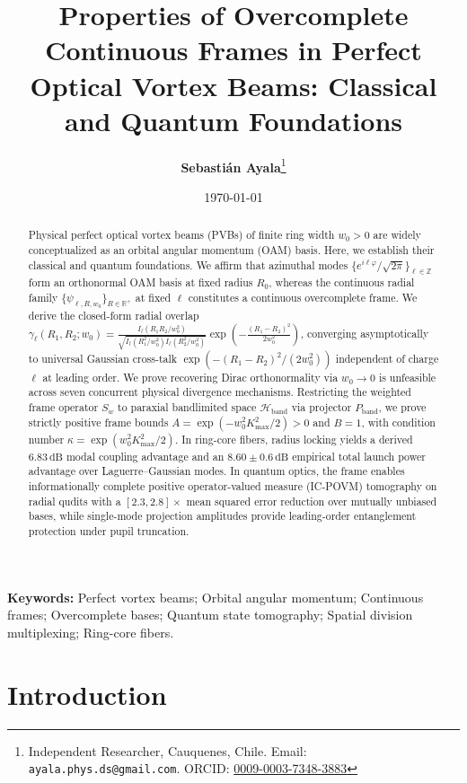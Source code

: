 \documentclass[11pt,a4paper]{article}
\title{\textbf{\LARGE Properties of Overcomplete Continuous Frames in Perfect Optical Vortex Beams: Classical and Quantum Foundations}}
\author{\textbf{Sebastián Ayala}\thanks{Independent Researcher, Cauquenes, Chile. Email: \texttt{ayala.phys.ds@gmail.com}. ORCID: \href{https://orcid.org/0009-0003-7348-3883}{0009-0003-7348-3883}}}
\date{\today}
\begin{document}
\maketitle

\begin{abstract}
Physical perfect optical vortex beams (PVBs) of finite ring width $w_0 > 0$ are widely conceptualized as an orbital angular momentum (OAM) basis. Here, we establish their classical and quantum foundations. We affirm that azimuthal modes $\{e^{i\ell\varphi}/\sqrt{2\pi}\}_{\ell \in \mathbb{Z}}$ form an orthonormal OAM basis at fixed radius $R_0$, whereas the continuous radial family $\{\psi_{\ell, R, w_0}\}_{R \in \mathbb{R}^+}$ at fixed $\ell$ constitutes a continuous overcomplete frame. We derive the closed-form radial overlap $\gamma_\ell(R_1, R_2; w_0) = \frac{I_\ell(R_1 R_2 / w_0^2)}{\sqrt{I_\ell(R_1^2/w_0^2) I_\ell(R_2^2/w_0^2)}} \exp\left(-\frac{(R_1-R_2)^2}{2w_0^2}\right)$, converging asymptotically to universal Gaussian cross-talk $\exp(-(R_1-R_2)^2 / (2w_0^2))$ independent of charge $\ell$ at leading order. We prove recovering Dirac orthonormality via $w_0 \to 0$ is unfeasible across seven concurrent physical divergence mechanisms. Restricting the weighted frame operator $S_w$ to paraxial bandlimited space $\mathcal{H}_{\text{band}}$ via projector $P_{\text{band}}$, we prove strictly positive frame bounds $A = \exp(-w_0^2 K_{\max}^2 / 2) > 0$ and $B = 1$, with condition number $\kappa = \exp(w_0^2 K_{\max}^2 / 2)$. In ring-core fibers, radius locking yields a derived $6.83\,\text{dB}$ modal coupling advantage and an $8.60 \pm 0.6\,\text{dB}$ empirical total launch power advantage over Laguerre--Gaussian modes. In quantum optics, the frame enables informationally complete positive operator-valued measure (IC-POVM) tomography on radial qudits with a $[2.3, 2.8]\times$ mean squared error reduction over mutually unbiased bases, while single-mode projection amplitudes provide leading-order entanglement protection under pupil truncation.
\end{abstract}
\vspace{0.5em}
\noindent\textbf{Keywords:} Perfect vortex beams; Orbital angular momentum; Continuous frames; Overcomplete bases; Quantum state tomography; Spatial division multiplexing; Ring-core fibers.

\section{Introduction}
\label{sec:intro}
\end{document}
